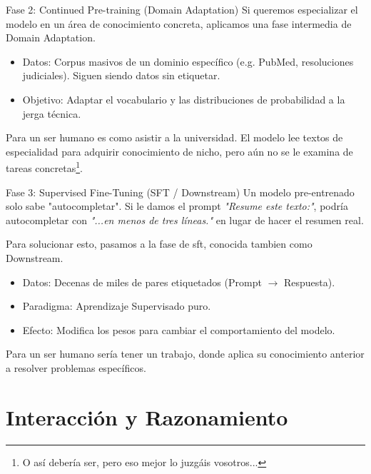 \begin{frame}{Fase 2: Continued Pre-training (Domain Adaptation)}
Si queremos especializar el modelo en un área de conocimiento concreta, aplicamos una fase intermedia de \alert{Domain Adaptation}.

\begin{itemize}
    \item \alert{Datos:} Corpus masivos de un dominio específico (e.g. PubMed, resoluciones judiciales). Siguen siendo datos \alert{sin etiquetar}.
    \item \alert{Objetivo:} Adaptar el vocabulario y las distribuciones de probabilidad a la jerga técnica. 
\end{itemize}

Para un ser humano es como asistir a la universidad. El modelo lee textos de especialidad para adquirir conocimiento de nicho, pero aún no se le examina de tareas concretas\footnote{O así debería ser, pero eso mejor lo juzgáis vosotros...}.
\end{frame}

\begin{frame}{Fase 3: Supervised Fine-Tuning (SFT / Downstream)}
Un modelo pre-entrenado solo sabe "\alert{autocompletar}". Si le damos el prompt \textit{"Resume este texto:"}, podría autocompletar con \textit{"...en menos de tres líneas."} en lugar de hacer el resumen real. 

Para solucionar esto, pasamos a la fase de \alert{\gls{sft}}, conocida tambien como \alert{Downstream}.
\begin{itemize}
    \item \alert{Datos:} Decenas de miles de pares etiquetados (Prompt $\rightarrow$ Respuesta).
    \item \alert{Paradigma:} Aprendizaje \alert{Supervisado} puro.
    \item \alert{Efecto:} Modifica los pesos para cambiar el comportamiento del modelo.
\end{itemize}

Para un ser humano sería tener un trabajo, donde aplica su conocimiento anterior a resolver problemas específicos.
\end{frame}

\section{Interacción y Razonamiento}

